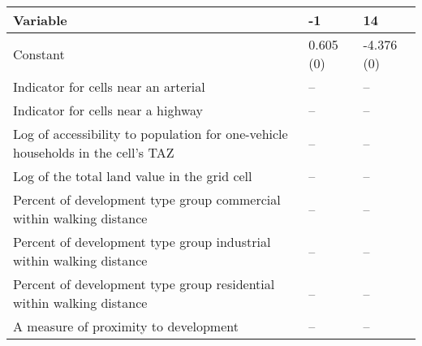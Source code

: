 
\begin{tabular}{p{3in}p{0.5in}p{0.5in}}
\hline\hline
Variable & -1 & 14 \\\hline
Constant & 0.605 (0) & -4.376 (0) \\
Indicator for cells near an arterial & -- & -- \\
Indicator for cells near a highway & -- & -- \\
Log of accessibility to population for one-vehicle households in the cell's TAZ & -- & -- \\
Log of the total land value in the grid cell & -- & -- \\
Percent of development type group commercial within walking distance & -- & -- \\
Percent of development type group industrial within walking distance & -- & -- \\
Percent of development type group residential within walking distance & -- & -- \\
A measure of proximity to development & -- & -- \\
\hline\hline
\end{tabular}
